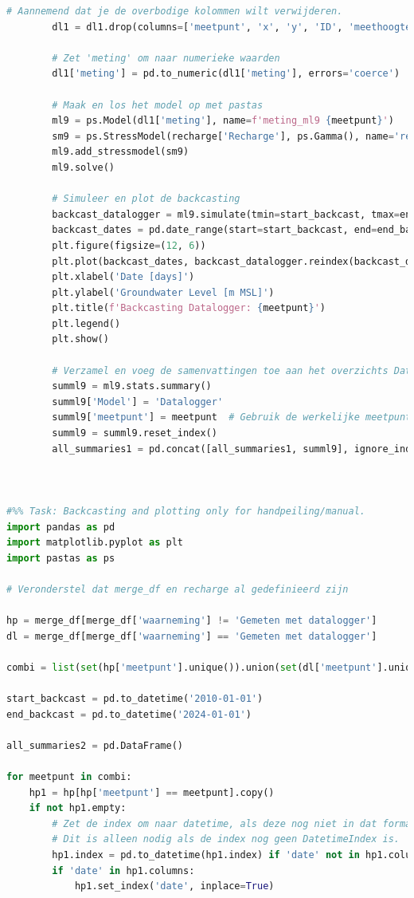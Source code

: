 \begin{lstlisting}[language=Python]
        # Aannemend dat je de overbodige kolommen wilt verwijderen.
        dl1 = dl1.drop(columns=['meetpunt', 'x', 'y', 'ID', 'meethoogte'], errors='ignore')

        # Zet 'meting' om naar numerieke waarden
        dl1['meting'] = pd.to_numeric(dl1['meting'], errors='coerce')

        # Maak en los het model op met pastas
        ml9 = ps.Model(dl1['meting'], name=f'meting_ml9 {meetpunt}')
        sm9 = ps.StressModel(recharge['Recharge'], ps.Gamma(), name='recharge', settings='evap')
        ml9.add_stressmodel(sm9)
        ml9.solve()

        # Simuleer en plot de backcasting
        backcast_datalogger = ml9.simulate(tmin=start_backcast, tmax=end_backcast)
        backcast_dates = pd.date_range(start=start_backcast, end=end_backcast, freq='D')
        plt.figure(figsize=(12, 6))
        plt.plot(backcast_dates, backcast_datalogger.reindex(backcast_dates), label='Datalogger', color='pink')
        plt.xlabel('Date [days]')
        plt.ylabel('Groundwater Level [m MSL]')
        plt.title(f'Backcasting Datalogger: {meetpunt}')
        plt.legend()
        plt.show()

        # Verzamel en voeg de samenvattingen toe aan het overzichts DataFrame
        summl9 = ml9.stats.summary()
        summl9['Model'] = 'Datalogger'
        summl9['meetpunt'] = meetpunt  # Gebruik de werkelijke meetpuntwaarde
        summl9 = summl9.reset_index()
        all_summaries1 = pd.concat([all_summaries1, summl9], ignore_index=True)


            
#%% Task: Backcasting and plotting only for handpeiling/manual. 
import pandas as pd
import matplotlib.pyplot as plt
import pastas as ps

# Veronderstel dat merge_df en recharge al gedefinieerd zijn

hp = merge_df[merge_df['waarneming'] != 'Gemeten met datalogger']
dl = merge_df[merge_df['waarneming'] == 'Gemeten met datalogger']

combi = list(set(hp['meetpunt'].unique()).union(set(dl['meetpunt'].unique())))

start_backcast = pd.to_datetime('2010-01-01')
end_backcast = pd.to_datetime('2024-01-01')

all_summaries2 = pd.DataFrame()

for meetpunt in combi:
    hp1 = hp[hp['meetpunt'] == meetpunt].copy()
    if not hp1.empty:
        # Zet de index om naar datetime, als deze nog niet in dat formaat is.
        # Dit is alleen nodig als de index nog geen DatetimeIndex is.
        hp1.index = pd.to_datetime(hp1.index) if 'date' not in hp1.columns else pd.to_datetime(hp1['date'])
        if 'date' in hp1.columns:
            hp1.set_index('date', inplace=True)
        

\end{lstlisting}
